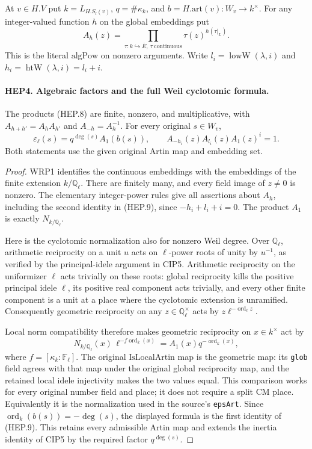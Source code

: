 \documentclass[11pt,a4paper]{article}
\numberwithin{equation}{section}
\theoremstyle{remark}\newtheorem{remark}[theorem]{Remark}
\begin{document}
At $v\in H.V$ put $k=L_{H.S_l(v)}$, $q=\#\kappa_k$, and
$b=H.\mathrm{art}(v):W_v\to k^\times$.
For any integer-valued function $h$ on the global embeddings put
\[
 A_h(z)=\prod_{\tau:k\hookrightarrow\overline E,\ \tau\ \text{continuous}}
                       \tau(z)^{h(\tau|_L)}.
 \tag{HEP.8}
\]
This is the literal $\mathrm{algPow}$ on nonzero arguments.
Write $l_i=\operatorname{lowW}(\lambda,i)$ and
$h_i=\operatorname{htW}(\lambda,i)=l_i+i$.

\paragraph{HEP4. Algebraic factors and the full Weil cyclotomic formula.}
\label{claim:HEP4}
The products (HEP.8) are finite, nonzero, and multiplicative, with
$A_{h+h'}=A_hA_{h'}$ and $A_{-h}=A_h^{-1}$.
For every original $s\in W_v$,
\[
 \varepsilon_\ell(s)=q^{\deg(s)}A_1(b(s)),\qquad
 A_{-h_i}(z)A_{l_i}(z)A_1(z)^i=1.
 \tag{HEP.9}
\]
Both statements use the given original Artin map and embedding set.
\begin{proof}
WRP1 identifies the continuous embeddings with the embeddings of
the finite extension $k/\mathbb Q_\ell$.  There are finitely many,
and every field image of $z\ne0$ is nonzero.  The elementary
integer-power rules give all assertions about $A_h$, including
the second identity in (HEP.9), since $-h_i+l_i+i=0$.
The product $A_1$ is exactly $N_{k/\mathbb Q_\ell}$.

Here is the cyclotomic normalization also for nonzero Weil degree.
Over $\mathbb Q_\ell$, arithmetic reciprocity on a unit $u$
acts on $\ell$-power roots of unity by $u^{-1}$, as verified by
the principal-idele argument in CIP5.  Arithmetic reciprocity
on the uniformizer $\ell$ acts trivially on these roots: global
reciprocity kills the positive principal idele $\ell$, its positive
real component acts trivially, and every other finite component
is a unit at a place where the cyclotomic extension is unramified.
Consequently geometric reciprocity on any
$z\in\mathbb Q_\ell^\times$ acts by
$z\ell^{-\operatorname{ord}_\ell z}$.

Local norm compatibility therefore makes geometric reciprocity on
$x\in k^\times$ act by
\[
       N_{k/\mathbb Q_\ell}(x)\,
             \ell^{-f\operatorname{ord}_k(x)}
            =A_1(x)q^{-\operatorname{ord}_k(x)},
\]
where $f=[\kappa_k:\mathbb F_\ell]$.
The original $\mathrm{IsLocalArtin}$ map is the geometric map:
its \texttt{glob} field agrees with that map under the original
global reciprocity map, and the retained local idele injectivity
makes the two values equal.  This comparison works for every
original number field and place; it does not require a split CM
place.  Equivalently it is the normalization used in the source's
\texttt{eps\allowbreak Art}.  Since
$\operatorname{ord}_k(b(s))=-\deg(s)$, the displayed formula is
the first identity of (HEP.9).  This retains every admissible
Artin map and extends the inertia identity of CIP5 by the required
factor $q^{\deg(s)}$.
\end{proof}
\end{document}
